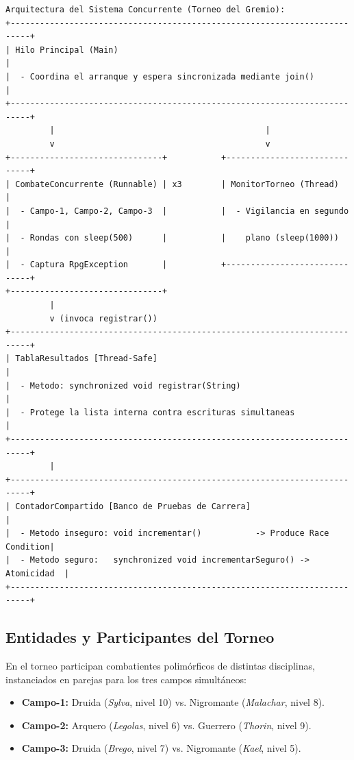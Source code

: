 \documentclass[11pt,letterpaper]{article}
\begin{document}
\begin{lstlisting}[style=TerminalStyle]
Arquitectura del Sistema Concurrente (Torneo del Gremio):
+--------------------------------------------------------------------------+
| Hilo Principal (Main)                                                    |
|  - Coordina el arranque y espera sincronizada mediante join()            |
+--------------------------------------------------------------------------+
         |                                           |
         v                                           v
+-------------------------------+           +------------------------------+
| CombateConcurrente (Runnable) | x3        | MonitorTorneo (Thread)       |
|  - Campo-1, Campo-2, Campo-3  |           |  - Vigilancia en segundo     |
|  - Rondas con sleep(500)      |           |    plano (sleep(1000))       |
|  - Captura RpgException       |           +------------------------------+
+-------------------------------+
         |
         v (invoca registrar())
+--------------------------------------------------------------------------+
| TablaResultados [Thread-Safe]                                            |
|  - Metodo: synchronized void registrar(String)                           |
|  - Protege la lista interna contra escrituras simultaneas                |
+--------------------------------------------------------------------------+
         |
+--------------------------------------------------------------------------+
| ContadorCompartido [Banco de Pruebas de Carrera]                         |
|  - Metodo inseguro: void incrementar()           -> Produce Race Condition|
|  - Metodo seguro:   synchronized void incrementarSeguro() -> Atomicidad  |
+--------------------------------------------------------------------------+
\end{lstlisting}

\subsection{Entidades y Participantes del Torneo}
En el torneo participan combatientes polimórficos de distintas disciplinas, instanciados en parejas para los tres campos simultáneos:
\begin{itemize}
    \item \textbf{Campo-1:} Druida (\textit{Sylva}, nivel 10) vs. Nigromante (\textit{Malachar}, nivel 8).
    \item \textbf{Campo-2:} Arquero (\textit{Legolas}, nivel 6) vs. Guerrero (\textit{Thorin}, nivel 9).
    \item \textbf{Campo-3:} Druida (\textit{Brego}, nivel 7) vs. Nigromante (\textit{Kael}, nivel 5).
\end{itemize}
\end{document}
